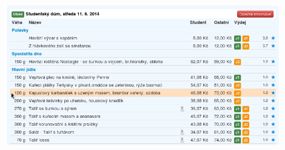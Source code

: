 \documentclass{beamer}
\begin{document}
\begin{frame}
	\begin{center}
	\includegraphics[width=0.9\textwidth]{obed_cenik.png}
	\end{center}
\end{frame}
\end{document}
